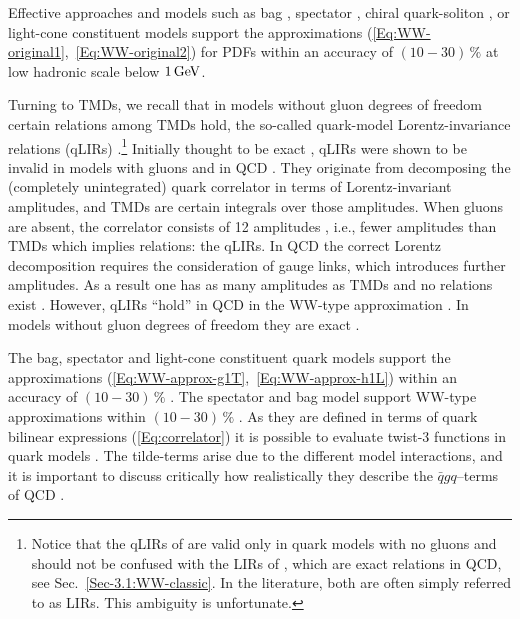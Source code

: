 \documentclass[a4paper,11pt]{article}
\begin{document}
Effective approaches and models such as bag 
\cite{Jaffe:1991ra,Stratmann:1993aw,Signal:1996ct,Avakian:2010br},
spectator \cite{Jakob:1997wg}, chiral quark-soliton 
\cite{Wakamatsu:2000ex}, or light-cone 
constituent \cite{Pasquini:2008ax,Lorce:2011dv} models
support the approximations (\ref{Eq:WW-original1},~\ref{Eq:WW-original2}) 
for PDFs within an accuracy of $(10-30)\,\%$ at low hadronic scale 
below $1\,{\rm GeV}$. 

Turning to TMDs, we recall that in models without gluon 
degrees of freedom certain relations among TMDs hold, the 
so-called quark-model Lorentz-invariance relations (qLIRs)
\cite{Tangerman:1994bb,Mulders:1995dh}.\footnote{Notice that
	the qLIRs of \cite{Tangerman:1994bb,Mulders:1995dh} are 
	valid only in quark models with no gluons and should not
	be confused with the LIRs of \cite{Kanazawa:2015ajw}, which 
	are exact relations in QCD, see Sec.~\ref{Sec-3.1:WW-classic}.
	In the literature, both are often simply referred to as LIRs.
	This ambiguity is unfortunate.}
Initially thought to be exact \cite{Tangerman:1994bb,Mulders:1995dh},
qLIRs were shown  to be invalid in models with gluons 
\cite{Kundu:2001pk,Schlegel:2004rg} and in QCD \cite{Goeke:2003az}.
They originate from decomposing the (completely unintegrated)
quark correlator in terms of Lorentz-invariant amplitudes, and 
TMDs are certain integrals over those amplitudes.
When gluons are absent, the correlator consists
of 12 amplitudes \cite{Tangerman:1994bb,Mulders:1995dh}, i.e., fewer 
amplitudes than TMDs which implies relations: the qLIRs. 
In QCD the correct Lorentz decomposition requires the consideration of 
gauge links, which introduces further amplitudes. As a result one has 
as many amplitudes as TMDs and no relations exist \cite{Goeke:2003az}. 
However, qLIRs ``hold'' in QCD in the WW-type approximation 
\cite{Metz:2008ib}. In models without gluon degrees of freedom 
they are exact
\cite{Metz:2008ib,Teckentrup:2009tk,Avakian:2010br,Jakob:1997wg}. 

The bag, spectator and light-cone constituent quark models support 
the approximations (\ref{Eq:WW-approx-g1T},~\ref{Eq:WW-approx-h1L}) 
within an accuracy of $(10-30)\,\%$ 
\cite{Jakob:1997wg,Pasquini:2008ax,Avakian:2010br,Lorce:2011dv}.
The spectator and bag model support WW-type approximations 
within $(10-30)\,\%$ \cite{Avakian:2010br}. 
As they are defined in terms of quark bilinear expressions 
(\ref{Eq:correlator}) it is possible to evaluate twist-3 functions
in quark models \cite{Jaffe:1991ra}. The tilde-terms arise due to
the different model interactions, and it is important to discuss
critically how realistically they describe the $\bar{q}gq$--terms
of QCD \cite{Lorce:2014hxa,Lorce:2016ugb}.
\end{document}
